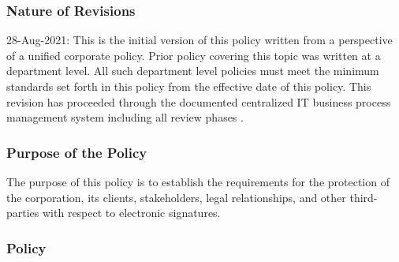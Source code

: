 \documentclass[stu]{apa7}
\begin{document}
\subsubsection{Nature of Revisions}
\label{sec:orgb099993}

28-Aug-2021: This is the initial version of this policy written from a perspective of a unified corporate policy. Prior policy covering this topic was written at a department level. All such department level policies must meet the minimum standards set forth in this policy from the effective date of this policy. This revision has proceeded through the documented centralized IT business process management system including all review phases \cite{wagleDevelopmentEffectiveCentralized2021}.

\subsubsection{Purpose of the Policy}
\label{sec:org1b13575}

The purpose of this policy is to establish the requirements for the protection of the corporation, its clients, stakeholders, legal relationships, and other third-parties with respect to electronic signatures.


\subsubsection{Policy}
\label{sec:org9d9dc39}
\end{document}

